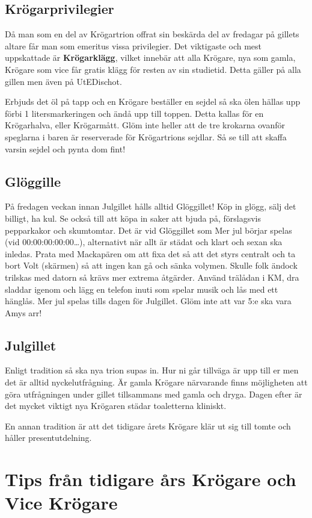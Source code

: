\documentclass[10pt]{article}
\begin{document}
\subsection{Krögarprivilegier}
Då man som en del av Krögartrion offrat sin beskärda del av fredagar på gillets altare får man som emeritus vissa privilegier. Det viktigaste och mest uppskattade är \textbf{Krögarklägg}, vilket innebär att alla Krögare, nya som gamla, Krögare som vice får gratis klägg för resten av sin studietid. Detta gäller på alla gillen men även på UtEDischot.

Erbjuds det öl på tapp och en Krögare beställer en sejdel så ska ölen hällas upp förbi 1 litersmarkeringen och ändå upp till toppen. Detta kallas för en Krögarhalva, eller Krögarmått. Glöm inte heller att de tre krokarna ovanför speglarna i baren är reserverade för Krögartrions sejdlar. Så se till att skaffa varsin sejdel och pynta dom fint!

\subsection{Glöggille}
På fredagen veckan innan Julgillet hålls alltid Glöggillet! Köp in glögg, sälj det billigt, ha kul. Se också till att köpa in saker att bjuda på, förslagsvis pepparkakor
och skumtomtar. Det är vid Glöggillet som Mer jul börjar spelas (vid 00:00:00:00:00…), alternativt när allt är städat och klart och sexan ska inledas. Prata med Mackapären om att fixa det så att det styrs centralt och ta bort Volt (skärmen) så att ingen kan gå och sänka volymen. Skulle folk ändock trilskas med datorn så krävs mer extrema åtgärder. Använd trälådan i KM, dra sladdar igenom och lägg en telefon inuti som spelar musik och lås med ett hänglås. Mer jul spelas tills dagen för Julgillet. Glöm inte att var 5:e ska vara Amys arr!

\subsection{Julgillet}
Enligt tradition så ska nya trion supas in. Hur ni går tillväga är upp till er men det är alltid nyckelutfrågning. Är gamla Krögare närvarande finns möjligheten att göra utfrågningen under gillet tillsammans med gamla och dryga. Dagen efter är det mycket viktigt nya Krögaren städar toaletterna kliniskt.

En annan tradition är att det tidigare årets Krögare klär ut sig till tomte och håller presentutdelning.


\section{Tips från tidigare års Krögare och Vice Krögare}
\end{document}
